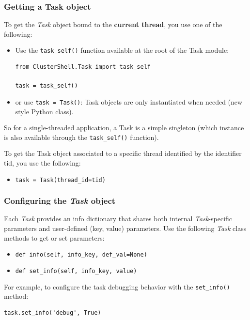 \documentclass[english,a4paper]{csuserguide}
\newcommand{\Task}{\textit{Task}\xspace}
\begin{document}
\subsubsection{Getting a Task object}

To get the \Task object bound to the \textbf{current thread}, you use one of the following:
\begin{itemize}
\item Use the \lstinline+task_self()+ function available at the root of the Task module:

\begin{lstlisting}[breaklines=true, breakatwhitespace=true]
from ClusterShell.Task import task_self

task = task_self()
\end{lstlisting}
\item or use \lstinline+task = Task()+: Task objects are only instantiated when needed (new style Python class).
\end{itemize}
So for a single-threaded application, a Task is a simple singleton (which instance is also available through the \verb+task_self()+ function).

To get the Task object associated to a specific thread identified by the identifier tid, you use the following:
\begin{itemize}
\item \lstinline+task = Task(thread_id=tid)+
\end{itemize}


\subsubsection{Configuring the \Task object}
\label{class-Task-configure}

Each \Task provides an info dictionary that shares both internal \Task-specific parameters and user-defined (key, value) parameters. Use the following \Task class methods to get or set parameters:
\begin{itemize}
\item \lstinline+def info(self, info_key, def_val=None)+
\item \lstinline+def set_info(self, info_key, value)+
\end{itemize}


For example, to configure the task debugging behavior with the \verb+set_info()+ method:
\begin{lstlisting}[breaklines=true, breakatwhitespace=true]
task.set_info('debug', True)
\end{lstlisting}
\end{document}
